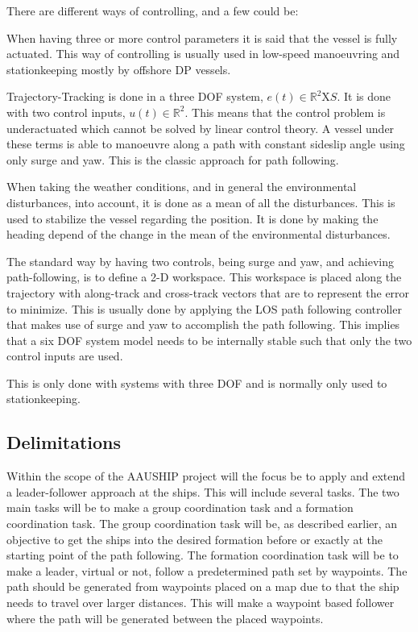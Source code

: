 There are different ways of controlling, and a few could be:
\begin{description}[style=nextline]
	\item [Three or more controls]
	When having three or more control parameters it is said that the vessel is fully actuated. This way of controlling is usually used in low-speed manoeuvring and stationkeeping mostly by offshore \ac{DP} vessels.
	\item [Two controls and Trajectory-Tracking control]
	Trajectory-Tracking is done in a three \ac{DOF} system, $e(t)\in\mathds{R}^2\text{X}S$. It is done with two control inputs, $u(t)\in\mathds{R}^2$. This means that the control problem is underactuated which cannot be solved by linear control theory. A vessel under these terms is able to manoeuvre along a path with constant sideslip angle using only surge and yaw. This is the classic approach for path following.
	\item [Two controls and Weather-Optimal heading]
	When taking the weather conditions, and in general the environmental disturbances, into account, it is done as a mean of all the disturbances. This is used to stabilize the vessel regarding the position. It is done by making the heading depend of the change in the mean of the environmental disturbances.
	\item [Two controls and Path-Following control]
	The standard way by having two controls, being surge and yaw, and achieving path-following, is to define a 2-D workspace. This workspace is placed along the trajectory with along-track and cross-track vectors that are to represent the error to minimize. This is usually done by applying the \ac{LOS} path following controller that makes use of surge and yaw to accomplish the path following. This implies that a six \ac{DOF} system model needs to be internally stable such that only the two control inputs are used.
	\item [One control]
	This is only done with systems with three \ac{DOF} and is normally only used to stationkeeping.
\end{description}
\citep{fossen}

\subsection{Delimitations}
Within the scope of the AAUSHIP project will the focus be to apply and extend a leader-follower approach at the ships. This will include several tasks. The two main tasks will be to make a group coordination task and a formation coordination task. The group coordination task will be, as described earlier, an objective to get the ships into the desired formation before or exactly at the starting point of the path following. The formation coordination task will be to make a leader, virtual or not, follow a predetermined path set by waypoints. The path should be generated from waypoints placed on a map due to that the ship needs to travel over larger distances. This will make a waypoint based follower where the path will be generated between the placed waypoints.

